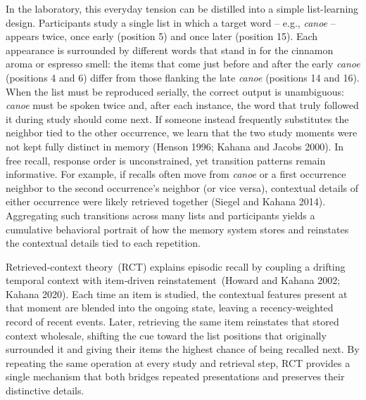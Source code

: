 \documentclass[
  letterpaper,
  11pt,
  english,
  singlespacing,
  headsepline]{MastersDoctoralThesis}
\begin{document}
In the laboratory, this everyday tension can be distilled into a simple
list-learning design. Participants study a single list in which a target
word -- e.g., \emph{canoe} -- appears twice, once early (position 5) and
once later (position 15). Each appearance is surrounded by different
words that stand in for the cinnamon aroma or espresso smell: the items
that come just before and after the early \emph{canoe} (positions 4 and
6) differ from those flanking the late \emph{canoe} (positions 14 and
16). When the list must be reproduced serially, the correct output is
unambiguous: \emph{canoe} must be spoken twice and, after each instance,
the word that truly followed it during study should come next. If
someone instead frequently substitutes the neighbor tied to the other
occurrence, we learn that the two study moments were not kept fully
distinct in memory (Henson 1996; Kahana and Jacobs 2000). In free
recall, response order is unconstrained, yet transition patterns remain
informative. For example, if recalls often move from \emph{canoe} or a
first occurrence neighbor to the second occurrence's neighbor (or vice
versa), contextual details of either occurrence were likely retrieved
together (Siegel and Kahana 2014). Aggregating such transitions across
many lists and participants yields a cumulative behavioral portrait of
how the memory system stores and reinstates the contextual details tied
to each repetition.

Retrieved‑context theory~(RCT) explains episodic recall by coupling a
drifting temporal context with item‑driven reinstatement~(Howard and
Kahana 2002; ~ Kahana 2020). Each time an item is studied, the
contextual features present at that moment are blended into the ongoing
state, leaving a recency‑weighted record of recent events. Later,
retrieving the same item reinstates that stored context wholesale,
shifting the cue toward the list positions that originally surrounded it
and giving their items the highest chance of being recalled next. By
repeating the same operation at every study and retrieval step, RCT
provides a single mechanism that both bridges repeated presentations and
preserves their distinctive details.
\end{document}
